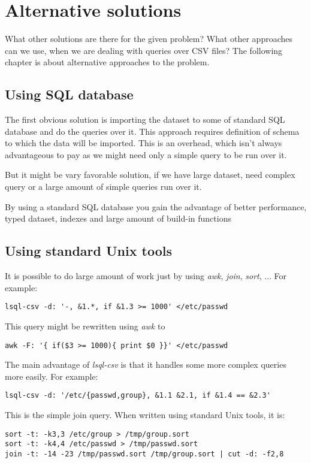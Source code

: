 
\chapter{Alternative solutions}
What other solutions are there for the given problem? What other approaches can we use, when we are dealing with queries over CSV files? 
The following chapter is about alternative approaches to the problem.

\section{Using SQL database}
The first obvious solution is importing the dataset to some of standard SQL database and do the queries over it. 
This approach requires definition of schema to which the data will be imported. This is an overhead, which isn't
always advantageous to pay as we might need only a simple query to be run over it.

But it might be vary favorable solution, if we have large dataset, need complex query or a large amount of simple queries run over it.

By using a standard SQL database you gain the advantage of better performance, typed dataset, indexes and large amount of build-in functions

\section{Using standard Unix tools}
It is possible to do large amount of work just by using \textit{awk}, \textit{join}, \textit{sort}, ...
For example:

\begin{verbatim}
lsql-csv -d: '-, &1.*, if &1.3 >= 1000' </etc/passwd
\end{verbatim}

This query might be rewritten using \textit{awk} to
\begin{verbatim}
awk -F: '{ if($3 >= 1000){ print $0 }}' </etc/passwd
\end{verbatim}

The main advantage of \textit{lsql-csv} is that it handles some more complex queries more easily. For example:
\begin{verbatim}
lsql-csv -d: '/etc/{passwd,group}, &1.1 &2.1, if &1.4 == &2.3'
\end{verbatim}

This is the simple join query. When written using standard Unix tools, it is:
\begin{verbatim}
sort -t: -k3,3 /etc/group > /tmp/group.sort
sort -t: -k4,4 /etc/passwd > /tmp/passwd.sort
join -t: -14 -23 /tmp/passwd.sort /tmp/group.sort | cut -d: -f2,8 
\end{verbatim}

